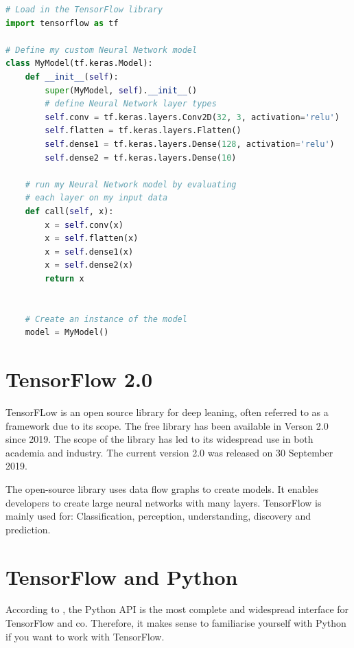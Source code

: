 \begin{code}
  \begin{lstlisting}[language=Python]
# Load in the TensorFlow library
import tensorflow as tf

# Define my custom Neural Network model
class MyModel(tf.keras.Model):
    def __init__(self):
        super(MyModel, self).__init__()
        # define Neural Network layer types
        self.conv = tf.keras.layers.Conv2D(32, 3, activation='relu')
        self.flatten = tf.keras.layers.Flatten()
        self.dense1 = tf.keras.layers.Dense(128, activation='relu')
        self.dense2 = tf.keras.layers.Dense(10)

    # run my Neural Network model by evaluating
    # each layer on my input data
    def call(self, x):
        x = self.conv(x)
        x = self.flatten(x)
        x = self.dense1(x)
        x = self.dense2(x)
        return x


    # Create an instance of the model
    model = MyModel()
  \end{lstlisting}
  \caption{Simple Example for TensorFlow}\label{TensorFlowSample}
\end{code}


\section{TensorFlow 2.0} 
 
TensorFLow is an open source library for deep leaning, often referred to as a framework due to its scope. The free library has been available in Verson 2.0 since 2019. The scope of the library has led to its widespread use in both academia and industry. The current version 2.0 was released on 30 September 2019.
\cite{GoogleTensorFlow:2019}

The open-source library uses data flow graphs to create models. 
It enables developers to create large neural networks with many layers. TensorFlow is mainly used for: Classification, perception, understanding, discovery and prediction. \cite{GoogleTensorFlow:2019} %

\section{TensorFlow and Python}

According to \cite{Heise:2020}, the Python API is the most complete and widespread interface for TensorFlow and co. Therefore, it makes sense to familiarise yourself with Python if you want to work with TensorFlow.



